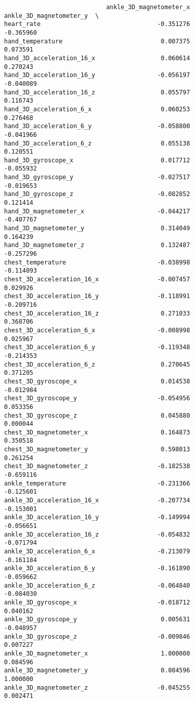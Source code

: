 \documentclass[11pt]{article}
\begin{document}
\begin{verbatim}
                            ankle_3D_magnetometer_x  ankle_3D_magnetometer_y  \
heart_rate                                -0.351276                -0.365960   
hand_temperature                           0.007375                 0.073591   
hand_3D_acceleration_16_x                  0.060614                 0.270243   
hand_3D_acceleration_16_y                 -0.056197                -0.040089   
hand_3D_acceleration_16_z                  0.055797                 0.116743   
hand_3D_acceleration_6_x                   0.060253                 0.276468   
hand_3D_acceleration_6_y                  -0.058800                -0.041966   
hand_3D_acceleration_6_z                   0.055138                 0.120551   
hand_3D_gyroscope_x                        0.017712                -0.055932   
hand_3D_gyroscope_y                       -0.027517                -0.019653   
hand_3D_gyroscope_z                       -0.082852                 0.121414   
hand_3D_magnetometer_x                    -0.044217                -0.407767   
hand_3D_magnetometer_y                     0.314049                 0.164239   
hand_3D_magnetometer_z                     0.132487                -0.257296   
chest_temperature                         -0.038998                -0.114093   
chest_3D_acceleration_16_x                -0.007457                 0.029926   
chest_3D_acceleration_16_y                -0.118991                -0.209716   
chest_3D_acceleration_16_z                 0.271033                 0.368706   
chest_3D_acceleration_6_x                 -0.008998                 0.025967   
chest_3D_acceleration_6_y                 -0.119348                -0.214353   
chest_3D_acceleration_6_z                  0.270645                 0.371205   
chest_3D_gyroscope_x                       0.014538                -0.012984   
chest_3D_gyroscope_y                      -0.054956                 0.053356   
chest_3D_gyroscope_z                       0.045880                 0.000044   
chest_3D_magnetometer_x                    0.164873                 0.350518   
chest_3D_magnetometer_y                    0.598013                 0.261254   
chest_3D_magnetometer_z                   -0.182538                -0.659116   
ankle_temperature                         -0.231366                -0.125601   
ankle_3D_acceleration_16_x                -0.207734                -0.153001   
ankle_3D_acceleration_16_y                -0.149994                -0.056651   
ankle_3D_acceleration_16_z                -0.054832                -0.071794   
ankle_3D_acceleration_6_x                 -0.213079                -0.161184   
ankle_3D_acceleration_6_y                 -0.161890                -0.059662   
ankle_3D_acceleration_6_z                 -0.064840                -0.084030   
ankle_3D_gyroscope_x                      -0.018712                 0.040162   
ankle_3D_gyroscope_y                       0.005631                -0.048957   
ankle_3D_gyroscope_z                      -0.009846                 0.007227   
ankle_3D_magnetometer_x                    1.000000                 0.084596   
ankle_3D_magnetometer_y                    0.084596                 1.000000   
ankle_3D_magnetometer_z                   -0.045255                 0.002471   


\end{verbatim}
\end{document}
